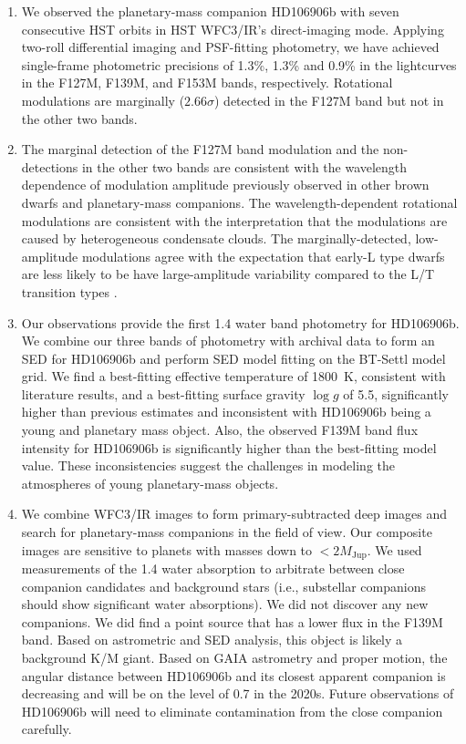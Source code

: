\documentclass[twocolumn]{aastex62}
\newcommand{\mjup}{\ensuremath{M_\mathrm{Jup}}\xspace}
\newcommand{\logg}{\ensuremath{\log(g)}\xspace}
\begin{document}
\begin{enumerate}
\item We observed the planetary-mass companion HD106906b with seven consecutive HST orbits in HST WFC3/IR's direct-imaging mode. Applying two-roll differential imaging and PSF-fitting photometry, we have achieved single-frame photometric precisions of 1.3\%, 1.3\% and 0.9\% in the lightcurves in the F127M, F139M, and F153M bands, respectively. Rotational modulations are marginally ($2.66\sigma$) detected in the F127M band but not in the other two bands.

\item {The marginal detection of the F127M band modulation and the non-detections in the other two bands are consistent with the wavelength dependence of modulation amplitude previously observed in other brown dwarfs and planetary-mass companions.} The wavelength-dependent rotational modulations are consistent with the interpretation that the modulations are caused by heterogeneous condensate clouds. The marginally-detected, low-amplitude modulations agree with the expectation that early-L type dwarfs are less likely to be have large-amplitude variability compared to the L/T transition types \citep[e.g.][]{Radigan2014,Metchev2015}.

\item Our observations provide the first 1.4 \micron{} water band photometry for HD106906b. We combine our three bands of photometry with archival data to form an SED for HD106906b and perform SED model fitting on the BT-Settl model grid. We find a best-fitting effective temperature of 1800~K, consistent with literature results, and a best-fitting surface gravity $\log g$ of 5.5,  significantly higher than previous estimates and inconsistent with HD106906b being a young and planetary mass object. Also, the observed F139M band flux intensity for HD106906b is significantly higher than the best-fitting model value.
  These inconsistencies suggest the challenges in modeling the atmospheres of young planetary-mass objects.

\item We combine WFC3/IR images to form primary-subtracted deep images and search for planetary-mass companions in the field of view. Our composite images are sensitive to planets with masses down to $< 2 \mjup$. We used measurements of the 1.4\micron{} water absorption to {arbitrate between close companion candidates and background stars} (i.e., substellar companions should show significant water absorptions). We did not discover  any new companions. We did find a point source that has a lower flux in the F139M band. Based on astrometric and SED analysis, this object is likely a background K/M giant.  Based on GAIA astrometry and proper motion, the angular distance between HD106906b and its closest apparent companion is decreasing and will be on the level of 0.7\arcsec{}  in the 2020s. Future observations of HD106906b will need to eliminate contamination from the close companion carefully.


\end{enumerate}
\end{document}
